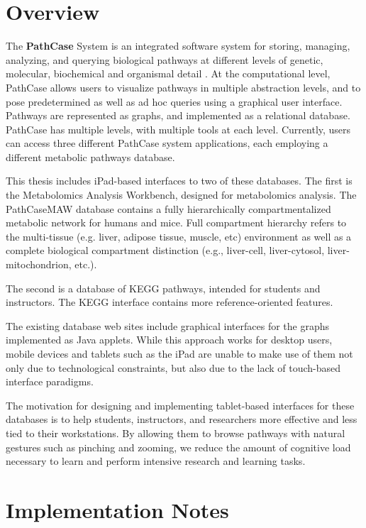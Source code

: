 \section{Overview}
\label{sect:overview}

The \textbf{PathCase} System is an integrated software system for storing,
managing, analyzing, and querying biological pathways at different levels of
genetic, molecular, biochemical and organismal detail \cite{pathcase-basic}. At
the computational level, PathCase allows users to visualize pathways in multiple
abstraction levels, and to pose predetermined as well as ad hoc queries using a
graphical user interface. Pathways are represented as graphs, and implemented as
a relational database. PathCase has multiple levels, with multiple tools at each
level. Currently, users can access three different PathCase system applications,
each employing a different metabolic pathways database.

This thesis includes iPad-based interfaces to two of these databases. The first
is the Metabolomics Analysis Workbench, designed for metabolomics analysis. The
PathCaseMAW database contains a fully hierarchically compartmentalized metabolic
network for humans and mice. Full compartment hierarchy refers to the
multi-tissue (e.g. liver, adipose tissue, muscle, etc) environment as well as a
complete biological compartment distinction (e.g., liver-cell, liver-cytosol,
liver-mitochondrion, etc.).

The second is a database of KEGG pathways, intended for students and
instructors. The KEGG interface contains more reference-oriented features.

The existing database web sites include graphical interfaces for the graphs
implemented as Java applets. While this approach works for desktop users, mobile
devices and tablets such as the iPad are unable to make use of them not only due
to technological constraints, but also due to the lack of touch-based interface
paradigms.

The motivation for designing and implementing tablet-based interfaces for these
databases is to help students, instructors, and researchers more effective and
less tied to their workstations. By allowing them to browse pathways with
natural gestures such as pinching and zooming, we reduce the amount of cognitive
load necessary to learn and perform intensive research and learning tasks.

\section{Implementation Notes}
\label{sect:implementation_notes}

